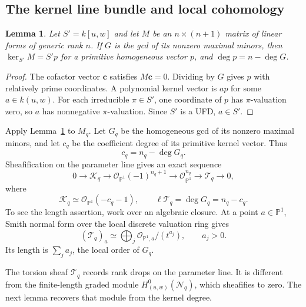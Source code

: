 \documentclass[11pt,a4paper,reqno]{amsart}
\numberwithin{equation}{section}
\theoremstyle{plain}
\newtheorem{lemma}[theorem]{Lemma}
\theoremstyle{definition}
\theoremstyle{remark}
\newcommand{\length}{\ell}
\begin{document}
\subsection{The kernel line bundle and local cohomology}
\begin{lemma}\label{lem:cofactor}
Let $S'=k[u,w]$ and let $M$ be an $n\times(n+1)$ matrix of linear forms
of generic rank $n$. If $G$ is the gcd of its nonzero maximal minors, then
$\ker_{S'} M=S'p$ for a primitive homogeneous vector $p$, and
$\deg p=n-\deg G$.
\end{lemma}
\begin{proof}
The cofactor vector $\mathbf c$ satisfies $M\mathbf c=0$. Dividing by $G$ gives
$p$ with relatively prime coordinates. A polynomial kernel vector is $ap$
for some $a\in k(u,w)$. For each irreducible $\pi\in S'$, one coordinate
of $p$ has $\pi$-valuation zero, so $a$ has nonnegative $\pi$-valuation.
Since $S'$ is a UFD, $a\in S'$.
\end{proof}
Apply Lemma~\ref{lem:cofactor} to $M_q$. Let $G_q$ be the homogeneous
gcd of its nonzero maximal minors, and let $c_q$ be the coefficient
degree of its primitive kernel vector. Thus
\begin{equation}\label{eq:index-gcd}
c_q=n_q-\deg G_q.
\end{equation}
Sheafification on the parameter line gives an exact sequence
\begin{equation}\label{eq:kernel-sheaf}
0\longrightarrow\mathcal K_q
\longrightarrow\mathcal O_{\mathbb P^1}(-1)^{n_q+1}
\longrightarrow\mathcal O_{\mathbb P^1}^{n_q}
\longrightarrow\mathcal T_q\longrightarrow0,
\end{equation}
where
\[
\mathcal K_q\simeq\mathcal O_{\mathbb P^1}(-c_q-1),
\qquad \length\mathcal T_q=\deg G_q=n_q-c_q.
\]
To see the length assertion, work over an algebraic closure.
At a point $a\in\mathbb P^1$, Smith normal form over the local discrete
valuation ring gives
\[
(\mathcal T_q)_a\simeq
\bigoplus_j\mathcal O_{\mathbb P^1,a}/(t^{a_j}),\qquad a_j>0.
\]
Its length is $\sum_j a_j$, the local order of $G_q$.


The torsion sheaf $\mathcal T_q$ records rank drops on the parameter
line. It is different from the finite-length graded module
$H^0_{(u,w)}(\mathcal N_q)$, which sheafifies to zero.
The next lemma recovers that module from the kernel degree.
\end{document}
